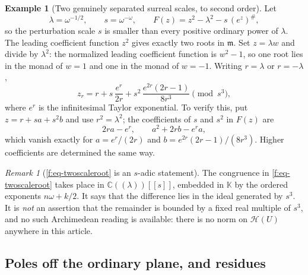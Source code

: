 \documentclass[11pt,a4paper]{article}
\numberwithin{equation}{section}
\theoremstyle{definition}
\newtheorem{example}[theorem]{Example}
\theoremstyle{remark}
\newtheorem{remark}[theorem]{Remark}
\theoremstyle{plain}
\newcommand{\K}{\mathbb K}
\newcommand{\CC}{\mathbb C}
\newcommand{\mm}{\mathfrak m}
\newcommand{\ev}[1]{#1^{\#}}
\newcommand{\Hc}{\mathcal H}
\begin{document}
\begin{example}[Two genuinely separated surreal scales, to second
order]\label{f:ex-twoscale}
Let
\[
 \lambda=\omega^{-1/2},\qquad s=\omega^{-\omega},\qquad
 F(z)=z^{2}-\lambda^{2}-s\,\ev{(e^{z})},
\]
so the perturbation scale $s$ is smaller than every positive ordinary
power of $\lambda$.  The leading coefficient function $z^{2}$ gives
exactly two roots in $\mm$.  Set $z=\lambda w$ and divide by
$\lambda^{2}$: the normalized leading coefficient function is $w^{2}-1$,
so one root lies in the monad of $w=1$ and one in the monad of $w=-1$.
Writing $r=\lambda$ or $r=-\lambda$,
\begin{equation}\label{f:eq-twoscaleroot}
 z_{r}=r+s\,\frac{e^{r}}{2r}
       +s^{2}\,\frac{e^{2r}(2r-1)}{8r^{3}}
       \pmod{s^{3}},
\end{equation}
where $e^{r}$ is the infinitesimal Taylor exponential.  To verify this,
put $z=r+sa+s^{2}b$ and use $r^{2}=\lambda^{2}$; the coefficients of
$s$ and $s^{2}$ in $F(z)$ are
\[
 2ra-e^{r},\qquad a^{2}+2rb-e^{r}a,
\]
which vanish exactly for $a=e^{r}/(2r)$ and
$b=e^{2r}(2r-1)/(8r^{3})$.  Higher coefficients are determined the same
way.
\end{example}

\begin{remark}[\eqref{f:eq-twoscaleroot} is an $s$-adic
statement]\label{f:rem-sadic}
The congruence in \eqref{f:eq-twoscaleroot} takes place in
$\CC((\lambda))[[s]]$, embedded in $\K$ by the ordered exponents
$n\omega+k/2$.  It says that the difference lies in the ideal generated
by $s^{3}$.  It is \emph{not} an assertion that the remainder is bounded
by a fixed real multiple of $s^{3}$, and no such Archimedean reading is
available: there is no norm on $\Hc(U)$ anywhere in this article.
\end{remark}

\subsection{Poles off the ordinary plane, and residues}
\label{f:sub-residueexamples}
\end{document}
